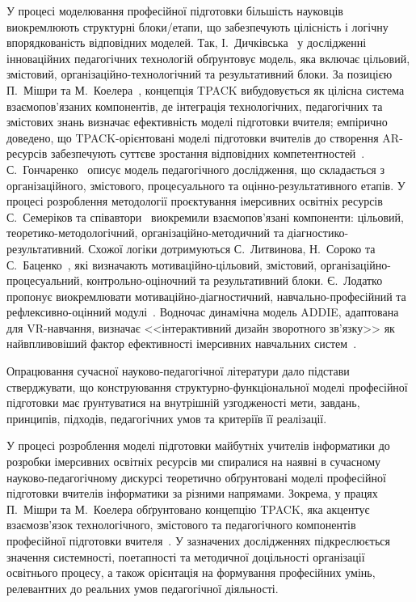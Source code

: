 У процесі моделювання професійної підготовки більшість науковців виокремлюють структурні блоки/етапи, що забезпечують цілісність і логічну впорядкованість відповідних моделей. Так, І.~Дичківська~\cite{Dychkivska2012Innovative} у дослідженні інноваційних педагогічних технологій обґрунтовує модель, яка включає цільовий, змістовий, організаційно-технологічний та результативний блоки. За позицією П.~Мішри та М.~Коелера~\cite{Gurevych2015Integration}, концепція TPACK вибудовується як цілісна система взаємопов'язаних компонентів, де інтеграція технологічних, педагогічних та змістових знань визначає ефективність моделі підготовки вчителя; емпірично доведено, що TPACK-орієнтовані моделі підготовки вчителів до створення AR-ресурсів забезпечують суттєве зростання відповідних компетентностей~\cite{BeldaMedina2022TPACK}. С.~Гончаренко~\cite{Goncharenko2011Pedagogy} описує модель педагогічного дослідження, що складається з організаційного, змістового, процесуального та оцінно-результативного етапів. У процесі розроблення методології проєктування імерсивних освітніх ресурсів С.~Семеріков та співавтори~\cite{Semerikov2022IERDesign} виокремили взаємопов'язані компоненти: цільовий, теоретико-методологічний, організаційно-методичний та діагностико-результативний. Схожої логіки дотримуються С.~Литвинова, Н.~Сороко та С.~Баценко~\cite{Lytvynova2023Monograph}, які визначають мотиваційно-цільовий, змістовий, організаційно-процесуальний, контрольно-оціночний та результативний блоки. Є.~Лодатко пропонує виокремлювати мотиваційно-діагностичний, навчально-професійний та рефлексивно-оцінний модулі~\cite{Lodatko2011Modeling}. Водночас динамічна модель ADDIE, адаптована для VR-навчання, визначає <<інтерактивний дизайн зворотного зв'язку>> як найвпливовіший фактор ефективності імерсивних навчальних систем~\cite{Li2024ADDIE}.

Опрацювання сучасної науково-педагогічної літератури дало підстави стверджувати, що конструювання структурно-функціональної моделі професійної підготовки має ґрунтуватися на внутрішній узгодженості мети, завдань, принципів, підходів, педагогічних умов та критеріїв її реалізації.

У процесі розроблення моделі підготовки майбутніх учителів інформатики до розробки імерсивних освітніх ресурсів ми спиралися на наявні в сучасному науково-педагогічному дискурсі теоретично обґрунтовані моделі професійної підготовки вчителів інформатики за різними напрямами. Зокрема, у працях П.~Мішри та М.~Коелера обґрунтовано концепцію TPACK, яка акцентує взаємозв'язок технологічного, змістового та педагогічного компонентів професійної підготовки вчителя~\cite{Gurevych2015Integration}. У зазначених дослідженнях підкреслюється значення системності, поетапності та методичної доцільності організації освітнього процесу, а також орієнтація на формування професійних умінь, релевантних до реальних умов педагогічної діяльності.

